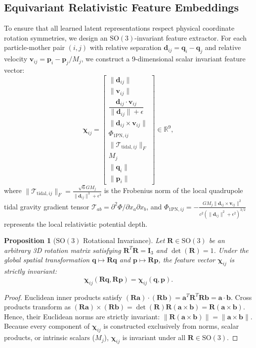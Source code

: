 \documentclass[preprint,12pt,3p]{elsarticle}
\newtheorem{proposition}{Proposition}
\begin{document}
\subsection{Equivariant Relativistic Feature Embeddings}
To ensure that all learned latent representations respect physical coordinate rotation symmetries, we design an $\mathrm{SO}(3)$-invariant feature extractor. For each particle-mother pair $(i, j)$ with relative separation $\bm{d}_{ij} = \bm{q}_i - \bm{q}_j$ and relative velocity $\bm{v}_{ij} = \bm{p}_i - \bm{p}_j / M_j$, we construct a 9-dimensional scalar invariant feature vector:
\begin{equation}
\bm{\chi}_{ij} = \begin{bmatrix}
\|\bm{d}_{ij}\| \\
\|\bm{v}_{ij}\| \\
\dfrac{\bm{d}_{ij} \cdot \bm{v}_{ij}}{\|\bm{d}_{ij}\| + \epsilon} \\
\|\bm{d}_{ij} \times \bm{v}_{ij}\| \\
\Phi_{1\mathrm{PN}, ij} \\
\|\bm{\mathcal{T}}_{\mathrm{tidal}, ij}\|_F \\
M_j \\
\|\bm{q}_i\| \\
\|\bm{p}_i\|
\end{bmatrix} \in \mathbb{R}^9,
\label{eq:invariant_features}
\end{equation}
where $\|\bm{\mathcal{T}}_{\mathrm{tidal}, ij}\|_F = \frac{\sqrt{6} G M_j}{\|\bm{d}_{ij}\|^3 + \epsilon^3}$ is the Frobenius norm of the local quadrupole tidal gravity gradient tensor $\mathcal{T}_{ab} = \partial^2 \Phi / \partial x_a \partial x_b$, and $\Phi_{1\mathrm{PN}, ij} = -\frac{G M_j \|\bm{d}_{ij} \times \bm{v}_{ij}\|^2}{c^2 (\|\bm{d}_{ij}\|^2 + \epsilon^2)^{3/2}}$ represents the local relativistic potential depth.

\begin{proposition}[$\mathrm{SO}(3)$ Rotational Invariance]
Let $\bm{R} \in \mathrm{SO}(3)$ be an arbitrary 3D rotation matrix satisfying $\bm{R}^T \bm{R} = \bm{I}_3$ and $\det(\bm{R}) = 1$. Under the global spatial transformation $\bm{q} \mapsto \bm{R}\bm{q}$ and $\bm{p} \mapsto \bm{R}\bm{p}$, the feature vector $\bm{\chi}_{ij}$ is strictly invariant:
\begin{equation}
\bm{\chi}_{ij}(\bm{R}\bm{q}, \bm{R}\bm{p}) = \bm{\chi}_{ij}(\bm{q}, \bm{p}).
\end{equation}
\end{proposition}
\begin{proof}
Euclidean inner products satisfy $(\bm{R}\bm{a}) \cdot (\bm{R}\bm{b}) = \bm{a}^T \bm{R}^T \bm{R} \bm{b} = \bm{a} \cdot \bm{b}$. Cross products transform as $(\bm{R}\bm{a}) \times (\bm{R}\bm{b}) = \det(\bm{R}) \bm{R}(\bm{a} \times \bm{b}) = \bm{R}(\bm{a} \times \bm{b})$. Hence, their Euclidean norms are strictly invariant: $\|\bm{R}(\bm{a} \times \bm{b})\| = \|\bm{a} \times \bm{b}\|$. Because every component of $\bm{\chi}_{ij}$ is constructed exclusively from norms, scalar products, or intrinsic scalars ($M_j$), $\bm{\chi}_{ij}$ is invariant under all $\bm{R} \in \mathrm{SO}(3)$.
\end{proof}
\end{document}
